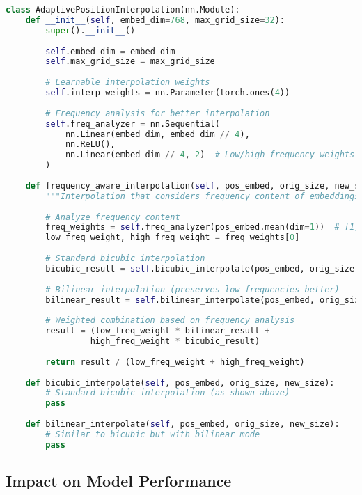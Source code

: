 \begin{lstlisting}[language=Python, caption=Advanced position embedding interpolation]
class AdaptivePositionInterpolation(nn.Module):
    def __init__(self, embed_dim=768, max_grid_size=32):
        super().__init__()
        
        self.embed_dim = embed_dim
        self.max_grid_size = max_grid_size
        
        # Learnable interpolation weights
        self.interp_weights = nn.Parameter(torch.ones(4))
        
        # Frequency analysis for better interpolation
        self.freq_analyzer = nn.Sequential(
            nn.Linear(embed_dim, embed_dim // 4),
            nn.ReLU(),
            nn.Linear(embed_dim // 4, 2)  # Low/high frequency weights
        )
    
    def frequency_aware_interpolation(self, pos_embed, orig_size, new_size):
        """Interpolation that considers frequency content of embeddings"""
        
        # Analyze frequency content
        freq_weights = self.freq_analyzer(pos_embed.mean(dim=1))  # [1, 2]
        low_freq_weight, high_freq_weight = freq_weights[0]
        
        # Standard bicubic interpolation
        bicubic_result = self.bicubic_interpolate(pos_embed, orig_size, new_size);
        
        # Bilinear interpolation (preserves low frequencies better)
        bilinear_result = self.bilinear_interpolate(pos_embed, orig_size, new_size);
        
        # Weighted combination based on frequency analysis
        result = (low_freq_weight * bilinear_result + 
                 high_freq_weight * bicubic_result)
        
        return result / (low_freq_weight + high_freq_weight)
    
    def bicubic_interpolate(self, pos_embed, orig_size, new_size):
        # Standard bicubic interpolation (as shown above)
        pass
    
    def bilinear_interpolate(self, pos_embed, orig_size, new_size):
        # Similar to bicubic but with bilinear mode
        pass
\end{lstlisting}

\subsection{Impact on Model Performance}

